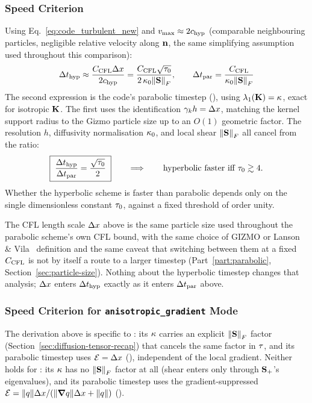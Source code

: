 \subsubsection{Speed Criterion}
\label{sec:speed-criterion}
Using Eq.~\eqref{eq:code_turbulent_new} and $v_{\max}\approx2c_{\rm hyp}$
(comparable neighbouring particles, negligible relative velocity along
$\mathbf{n}$, the same simplifying assumption used throughout this
comparison):
\begin{equation}
  \Delta t_{\rm hyp} \approx \frac{C_{\mathrm{CFL}}\Delta x}{2c_{\rm hyp}}
  = \frac{C_{\mathrm{CFL}}\sqrt{\tau_0}}{2\,\kappa_{0}\norm{\mathbf{S}}_F} ,
  \qquad
  \Delta t_{\rm par} = \frac{C_{\mathrm{CFL}}}{\kappa_{0}\norm{\mathbf{S}}_F}
\end{equation}
The second expression is the code's 
parabolic timestep (), using
$\lambda_1(\mathbf{K})=\kappa$, exact for isotropic $\mathbf{K}$. The first uses
the identification $\gamma_{k} h=\Delta x$, matching the kernel support radius
to the Gizmo particle size up to an $O(1)$ geometric factor. The
resolution $h$, diffusivity normalisation
$\kappa_{0}$, and local shear $\norm{\mathbf{S}}_F$ all cancel from the ratio:
\begin{equation}
  \label{eq:revised_ratio}
  \boxed{\;\frac{\Delta t_{\rm hyp}}{\Delta t_{\rm par}} = \frac{\sqrt{\tau_0}}{2} \;}
  \qquad\Longrightarrow\qquad
  \text{hyperbolic faster iff } \tau_0 \gtrsim 4 .
\end{equation}
Whether the hyperbolic scheme is faster than parabolic depends only on
the single dimensionless constant $\tau_0$, against a fixed
threshold of order unity.

\begin{remark}
\label{rem:particle-size-definitions}
The CFL length scale $\Delta x$ above is the same particle size used
throughout the parabolic scheme's own CFL bound, with the same choice of
GIZMO or Lanson \& Vila~\citeyear{LansonVila2008} definition and the same
caveat that switching between them at a fixed $C_{\mathrm{CFL}}$ is not by itself a
route to a larger timestep (Part~\ref{part:parabolic},
Section~\ref{sec:particle-size}). Nothing about the hyperbolic timestep
changes that analysis; $\Delta x$ enters $\Delta t_{\rm hyp}$ exactly as it enters
$\Delta t_{\rm par}$ above.
\end{remark}

\subsubsection{Speed Criterion for \texttt{anisotropic\_gradient} Mode}
\label{sec:speed-criterion-aniso}
The derivation above is specific to : its
$\kappa$ carries an explicit $\norm{\mathbf{S}}_F$ factor
(Section~\ref{sec:diffusion-tensor-recap}) that cancels the same factor
in $\tau$, and its parabolic timestep uses $\mathcal{E}=\Delta x$
(), independent of the local
gradient. Neither holds for : its $\kappa$
has no $\norm{\mathbf{S}}_F$ factor at all (shear enters only through
$\mathbf{S}_{+}$'s eigenvalues), and its parabolic timestep uses the
gradient-suppressed
$\mathcal{E}=\norm{q}\Delta x/(\norm{\grad q}\Delta x+\norm{q})$
().

